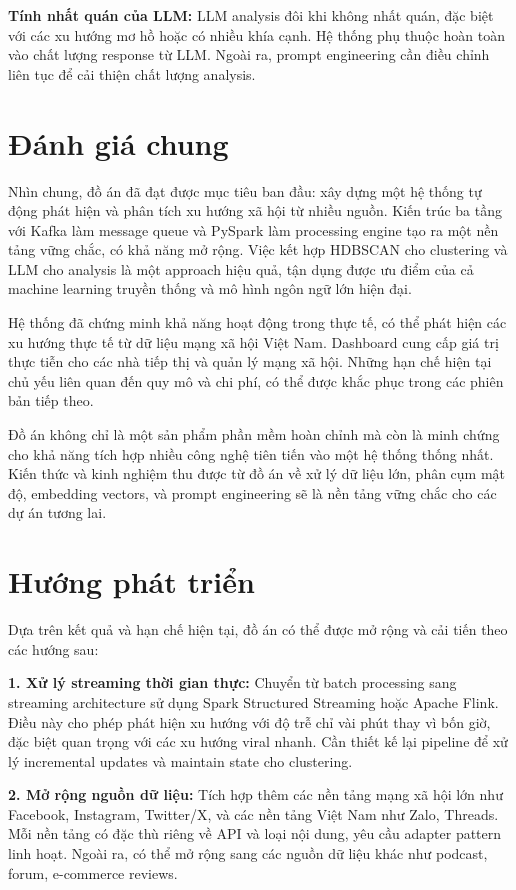 \textbf{Tính nhất quán của LLM:} LLM analysis đôi khi không nhất quán, đặc biệt với các xu hướng mơ hồ hoặc có nhiều khía cạnh. Hệ thống phụ thuộc hoàn toàn vào chất lượng response từ LLM. Ngoài ra, prompt engineering cần điều chỉnh liên tục để cải thiện chất lượng analysis.

\section{Đánh giá chung}

Nhìn chung, đồ án đã đạt được mục tiêu ban đầu: xây dựng một hệ thống tự động phát hiện và phân tích xu hướng xã hội từ nhiều nguồn. Kiến trúc ba tầng với Kafka làm message queue và PySpark làm processing engine tạo ra một nền tảng vững chắc, có khả năng mở rộng. Việc kết hợp HDBSCAN cho clustering và LLM cho analysis là một approach hiệu quả, tận dụng được ưu điểm của cả machine learning truyền thống và mô hình ngôn ngữ lớn hiện đại.

Hệ thống đã chứng minh khả năng hoạt động trong thực tế, có thể phát hiện các xu hướng thực tế từ dữ liệu mạng xã hội Việt Nam. Dashboard cung cấp giá trị thực tiễn cho các nhà tiếp thị và quản lý mạng xã hội. Những hạn chế hiện tại chủ yếu liên quan đến quy mô và chi phí, có thể được khắc phục trong các phiên bản tiếp theo.

Đồ án không chỉ là một sản phẩm phần mềm hoàn chỉnh mà còn là minh chứng cho khả năng tích hợp nhiều công nghệ tiên tiến vào một hệ thống thống nhất. Kiến thức và kinh nghiệm thu được từ đồ án về xử lý dữ liệu lớn, phân cụm mật độ, embedding vectors, và prompt engineering sẽ là nền tảng vững chắc cho các dự án tương lai.

\section{Hướng phát triển}

Dựa trên kết quả và hạn chế hiện tại, đồ án có thể được mở rộng và cải tiến theo các hướng sau:

\textbf{1. Xử lý streaming thời gian thực:} Chuyển từ batch processing sang streaming architecture sử dụng Spark Structured Streaming hoặc Apache Flink. Điều này cho phép phát hiện xu hướng với độ trễ chỉ vài phút thay vì bốn giờ, đặc biệt quan trọng với các xu hướng viral nhanh. Cần thiết kế lại pipeline để xử lý incremental updates và maintain state cho clustering.

\textbf{2. Mở rộng nguồn dữ liệu:} Tích hợp thêm các nền tảng mạng xã hội lớn như Facebook, Instagram, Twitter/X, và các nền tảng Việt Nam như Zalo, Threads. Mỗi nền tảng có đặc thù riêng về API và loại nội dung, yêu cầu adapter pattern linh hoạt. Ngoài ra, có thể mở rộng sang các nguồn dữ liệu khác như podcast, forum, e-commerce reviews.

